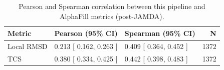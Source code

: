 \begin{table}[ht]
    \centering
    \begin{tabular}{lllr}
        \toprule
        Metric     & Pearson (95\% CI)      & Spearman (95\% CI)     & N    \\
        \midrule
        Local RMSD & 0.213 [ 0.162, 0.263 ] & 0.409 [ 0.364, 0.452 ] & 1372 \\
        TCS        & 0.380 [ 0.334, 0.425 ] & 0.442 [ 0.398, 0.483 ] & 1372 \\
        \bottomrule
    \end{tabular}
    \caption[FoldFusion vs AlphaFill correlations]{Pearson and Spearman correlation between this pipeline and AlphaFill metrics (post-JAMDA).}
    \label{tab:ff-af-corr}
\end{table}
